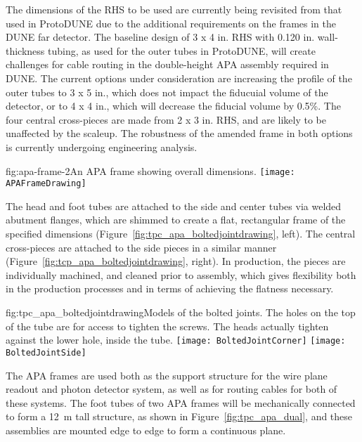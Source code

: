 The dimensions of the RHS to be used are currently being revisited from that used in ProtoDUNE due to the additional requirements on the frames in the DUNE far detector.  The baseline design of 3 x 4 in. RHS with 0.120 in. wall-thickness tubing, as used for the outer tubes in ProtoDUNE, will create challenges for cable routing in the double-height APA assembly required in DUNE.  The current options under consideration are increasing the profile of the outer tubes to 3 x 5 in., which does not impact the fiducuial volume of the detector, or to 4 x 4 in., which will decrease the fiducial volume by 0.5\%.  The four central cross-pieces are made from 2 x 3 in. RHS, and are likely to be unaffected by the scaleup. The robustness of the amended frame in both options is currently undergoing engineering analysis.  

\begin{dunefigure}{fig:apa-frame-2}{An APA frame showing overall dimensions.}
\texttt{[image: APAFrameDrawing]} 
\end{dunefigure}

The head and foot tubes are attached to the side and center tubes via welded abutment flanges, which are shimmed to create a flat, rectangular frame of the specified dimensions (Figure~\ref{fig:tpc_apa_boltedjointdrawing}, left).  The central cross-pieces are attached to the side pieces in a similar manner (Figure~\ref{fig:tcp_apa_boltedjointdrawing}, right).  In production, the pieces are individually machined, and cleaned prior to assembly, which gives flexibility both in the production processes and in terms of achieving the flatness necessary.  

\begin{dunefigure}{fig:tpc_apa_boltedjointdrawing}{Models of the bolted joints. The holes on the top of the tube are for access to tighten the screws. The heads actually tighten against the lower hole, inside the tube.}
\texttt{[image: BoltedJointCorner]} 
\texttt{[image: BoltedJointSide]} 
\end{dunefigure}

The APA frames are used both as the support structure for the wire plane readout and photon detector system, as well as for routing cables for both of these systems. The foot tubes of two APA frames will be mechanically connected to form a 12~m tall structure, as shown in Figure~\ref{fig:tpc_apa_dual}, and these assemblies are mounted edge to edge to form a continuous plane. 

